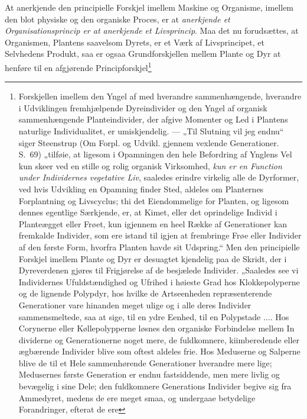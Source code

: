 \documentclass[11pt]{book}
\newcommand{\opage}[1]{\marginnote{\footnotesize\textit{[#1]}}}
\begin{document}
\opage{359} \setcounter{footnote}{0}%
At anerkjende den principielle Forskjel imellem Maskine og Organisme,
imellem den blot physiske og den organiske
\opage{360} \setcounter{footnote}{0}%
Proces, er at \emph{anerkjende et Organisationsprincip er at
anerkjende et Livsprincip}. Maa det nu forudsættes, at Organismen,
Plantens saavelsom Dyrets, er et Værk af Livsprincipet, et Selvhedens
Produkt, saa er ogsaa Grundforskjellen mellem Plante og Dyr at henføre
til en afgjørende Principforskjel\footnote{%
Forskjellen imellem den Yngel af med hverandre sammenhængende,
hverandre i Udviklingen fremhjælpende Dyreindivider og den Yngel af
organisk sammenhængende Planteindivider, der afgive Momenter og Led i
Plantens naturlige Individualitet, er umiskjendelig. --- „Til Slutning
vil jeg endnu“ siger Steenstrup (Om Forpl. og Udvikl. gjennem
vexlende Generationer. S.~69) „tilføie, at ligesom i Opamningen den
hele Befordring af Ynglens Vel kun skeer ved en stille og rolig
organisk Virksomhed, \emph{kun er en Function under Individernes
vegetative Liv}, saaledes erindre virkelig alle de Dyrformer, ved hvis
Udvikling en Opamning finder Sted, aldeles om Planternes Forplantning
og Livscyclus; thi det Eiendommelige for Planten, og ligesom dennes
egentlige Særkjende, er, at Kimet, eller det oprindelige Individ i
Planteægget eller Frøet, kun igjennem en heel Række af Generationer
kan fremkalde Individer, som ere istand til igjen at frembringe Frøe
eller Individer af den første Form, hvorfra Planten havde sit
Udspring.“ Men den principielle Forskjel imellem Plante og Dyr er
desuagtet kjendelig paa de Skridt, der i Dyreverdenen gjøres til
Frigjørelse af de besjælede Individer. „Saaledes see vi Individernes
Ufuldstændighed og Ufrihed i høieste Grad hos Klokkepolyperne og de
lignende Polypdyr, hos hvilke de Artseenheden repræsenterende
Generationer vare hinanden meget ulige og i alle deres Individer
sammensmeltede, saa at sige, til en ydre Eenhed, til en Polypstade
.... Hos Corynerne eller Køllepolypperne løsnes den organiske
Forbindelse mellem In\-%
dividerne og Generationerne noget mere, de fuldkomnere,
kiimberedende eller ægbærende Individer blive som oftest aldeles frie.
Hos Meduserne og Salperne blive de til et Hele sammenhørende
Generationer hverandre mere lige; Medusernes første Generation er
endnu fastsiddende, men mere livlig og bevægelig i sine Dele; den
fuldkomnere Generations Individer begive sig fra Ammedyret, medens de
ere meget smaa, og undergaae betydelige Forandringer, efterat de ere
}
\end{document}
